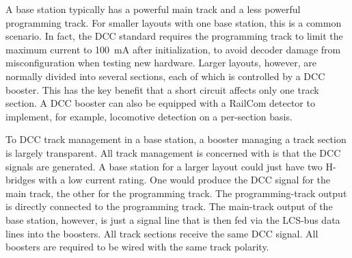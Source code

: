 
A base station typically has a powerful main track and a less powerful programming track. For smaller layouts with one base station, this is a common scenario. In fact, the DCC standard requires the programming track to limit the maximum current to 100~mA after initialization, to avoid decoder damage from misconfiguration when testing new hardware. Larger layouts, however, are normally divided into several sections, each of which is controlled by a DCC booster. This has the key benefit that a short circuit affects only one track section. A DCC booster can also be equipped with a RailCom detector to implement, for example, locomotive detection on a per-section basis.

To DCC track management in a base station, a booster managing a track section is largely transparent. All track management is concerned with is that the DCC signals are generated. A base station for a larger layout could just have two H-bridges with a low current rating. One would produce the DCC signal for the main track, the other for the programming track. The programming-track output is directly connected to the programming track. The main-track output of the base station, however, is just a signal line that is then fed via the LCS-bus data lines into the boosters. All track sections receive the same DCC signal. All boosters are required to be wired with the same track polarity.


